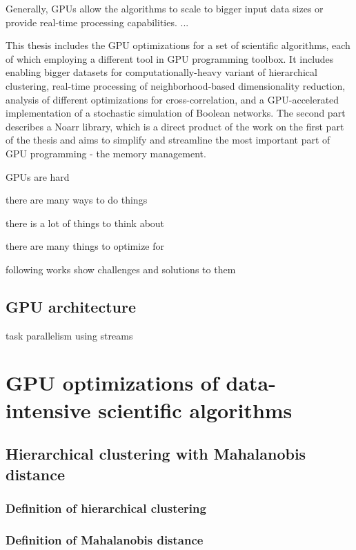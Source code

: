 \documentclass[12pt,a4paper]{report}
\begin{document}
Generally, GPUs allow the algorithms to scale to bigger input data sizes or provide real-time processing capabilities. ...

This thesis includes the GPU optimizations for a set of scientific algorithms, each of which employing a different tool in GPU programming toolbox. 
It includes enabling bigger datasets for computationally-heavy variant of hierarchical clustering, real-time processing of neighborhood-based dimensionality reduction, analysis of different optimizations for cross-correlation, and a GPU-accelerated implementation of a stochastic simulation of Boolean networks.
The second part describes a Noarr library, which is a direct product of the work on the first part of the thesis and aims to simplify and streamline the most important part of GPU programming - the memory management.




GPUs are hard

there are many ways to do things

there is a lot of things to think about

there are many things to optimize for

following works show challenges and solutions to them

\section{GPU architecture}

task parallelism using streams

\chapter{GPU optimizations of data-intensive scientific algorithms}

\section{Hierarchical clustering with Mahalanobis distance}

\subsection{Definition of hierarchical clustering}

\subsection{Definition of Mahalanobis distance}
\end{document}
